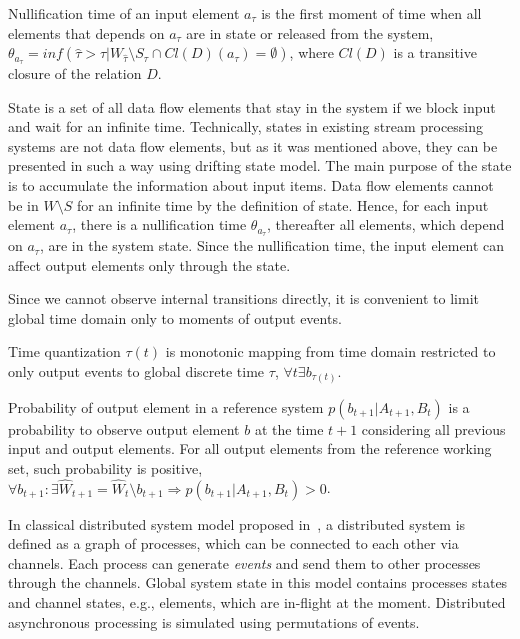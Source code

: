 \begin{definition}{Nullification time}
of an input element $a_\tau$ is the first moment of time when all elements that depends on $a_\tau$ are in state or released from the system, $\theta_{a_\tau}=inf(\hat{\tau}>\tau|W_{\hat{\tau}}\setminus{S_{\hat{\tau}}}\cap{Cl(D)(a_\tau)=\emptyset})$, where $Cl(D)$ is a transitive closure of the relation $D$.
\end{definition}

State is a set of all data flow elements that stay in the system if we block input and wait for an infinite time. Technically, states in existing stream processing systems are not data flow elements, but as it was mentioned above, they can be presented in such a way using drifting state model. The main purpose of the state is to accumulate the information about input items. Data flow elements cannot be in $W\setminus{S}$ for an infinite time by the definition of state. Hence, for each input element $a_\tau$, there is a nullification time $\theta_{a_\tau}$, thereafter all elements, which depend on $a_\tau$, are in the system state. Since the nullification time, the input element can affect output elements only through the state.

Since we cannot observe internal transitions directly, it is convenient to limit global time domain only to moments of output events.

\begin{definition}{Time quantization}
$\tau(t)$ is monotonic mapping from time domain restricted to only output events to global discrete time $\tau$, $\forall{t}\exists{b_{\tau(t)}}$.
\end{definition}

\begin{definition}{Probability of output element in a reference system}
$p(b_{t+1}|A_{t+1}, B_t)$ is a probability to observe output element $b$ at the time $t+1$ considering all previous input and output elements. For all output elements from the reference working set, such probability is positive,\\
$\forall{b_{t+1}:\exists{\widehat{W}_{t+1}=\widehat{W}_{t}\setminus{b_{t+1}}}} \Rightarrow p(b_{t+1}|A_{t+1}, B_t) > 0$.
\end{definition}

In classical distributed system model proposed in~\cite{Chandy:1985:DSD:214451.214456}, a distributed system is defined as a graph of processes, which can be connected to each other via channels. Each process can generate {\em events} and send them to other processes through the channels. Global system state in this model contains processes states and channel states, e.g., elements, which are in-flight at the moment. Distributed asynchronous processing is simulated using permutations of events. 

